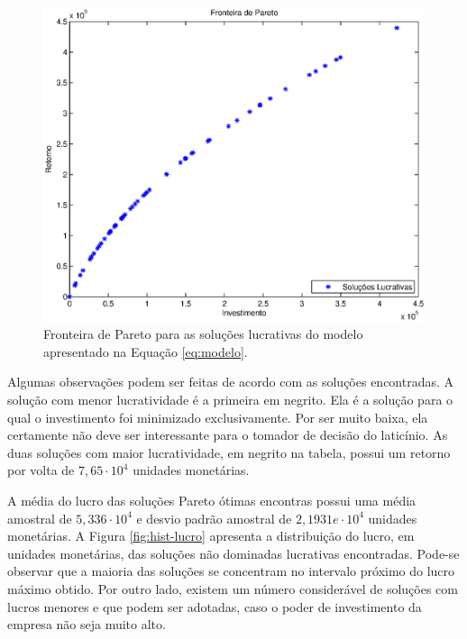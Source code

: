 \documentclass [11pt]{articleSBPO}
\begin{document}
\begin{figure}
	\centering
	\includegraphics[width=12.0cm]{img/fronteira-lucro}
	\caption{Fronteira de Pareto para as soluções lucrativas do modelo apresentado na Equação \ref{eq:modelo}.}
	\label{fig:fronteira}
\end{figure}

Algumas observações podem ser feitas de acordo com as soluções encontradas. A solução com menor lucratividade é a primeira em negrito. Ela é a solução para o qual o investimento foi minimizado exclusivamente. Por ser muito baixa, ela certamente não deve ser interessante para o tomador de decisão do laticínio. As duas soluções com maior lucratividade, em negrito na tabela, possui um retorno por volta de $ 7,65 \cdot 10^4 $ unidades monetárias.

A média do lucro das soluções Pareto ótimas encontras possui uma média amostral de $ 5,336 \cdot 10^4 $ e desvio padrão amostral de $  2,1931e \cdot 10^4 $ unidades monetárias. A Figura \ref{fig:hist-lucro} apresenta a distribuição do lucro, em unidades monetárias, das soluções não dominadas lucrativas encontradas. Pode-se observar que a maioria das soluções se concentram no intervalo próximo do lucro máximo obtido. Por outro lado, existem um número considerável de soluções com lucros menores e que podem ser adotadas, caso o poder de investimento da empresa não seja muito alto.
\end{document}
